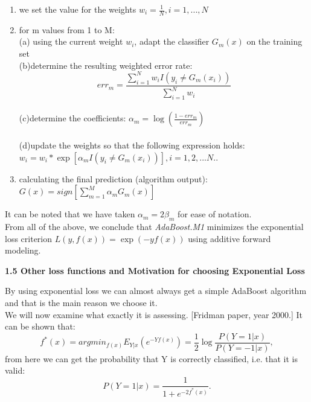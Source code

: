 \documentclass[12pt, letterpaper, twoside]{article}
\begin{document}
\begin{enumerate}
\item we set the value for the weights $w_i=\frac{1}{N},i=1,...,N$
\item for m values from 1 to M:\\
\hspace*{4ex}(a) using the current weight $w_i$, adapt the classifier $G_m(x)$ on the training set\\
\hspace*{4ex}(b)\space determine the resulting weighted error rate:
\begin{equation*}
err_m=\frac{\sum_{i=1}^N w_i I(y_i\neq G_m(x_i))}{\sum_{i=1}^N w_i}
\end{equation*}\\
\hspace*{4ex}(c)\space determine the coefficients: $\alpha_m=\log(\frac{1-err_m}{err_m})$\\\\
\hspace*{4ex}(d)\space update the weights so that the following expression holds:\\ \hspace*{6ex}$w_i=w_i*\exp [\alpha_m I(y_i\neq G_m(x_i))], i=1,2,...N.$.
\item calculating the final prediction (algorithm output): $G(x)=sign[\sum_{m=1}^M\alpha_m G_m(x)]$
\end{enumerate}
It can be noted that we have taken $\alpha_m=2\beta_m$ for ease of notation.\\ 
From all of the above, we conclude that \emph{AdaBoost.M1} minimizes the exponential loss criterion $L(y,f(x))=\exp(-yf(x))$ using additive forward modeling.\\
\begin{center}
\textbf{\large{1.5 Other loss functions and Motivation for choosing Exponential Loss }\\}
\end{center}
By using exponential loss we can almost always get a simple AdaBoost algorithm and that is the main reason we choose it.\\
We will now examine what exactly it is assessing.
[Fridman paper, year 2000.] It can be shown that:
\begin{equation*}
f^*(x)=argmin_{f(x)}E_{Y|x}(e^{-Yf(x)})=\frac{1}{2}\log\frac{P(Y=1|x)}{P(Y=-1|x)},
\end{equation*}
from here we can get the probability that Y is correctly classified, i.e. that it is valid:
\begin{equation*}
P(Y=1|x)=\frac{1}{1+e^{-2f^*(x)}}.
\end{equation*}
\end{document}
